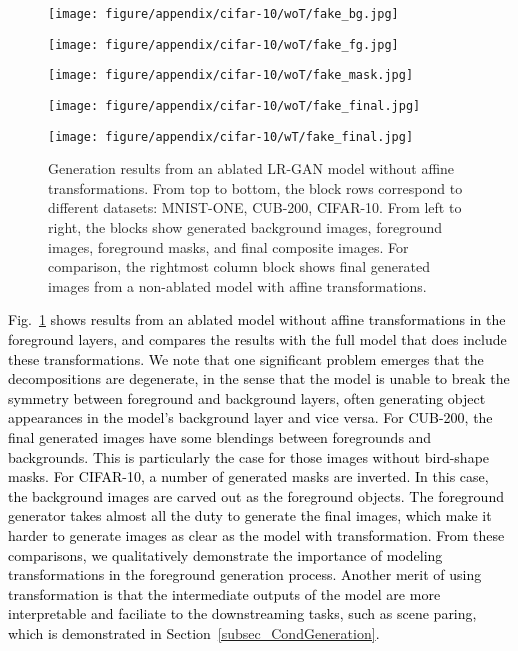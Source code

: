 \documentclass{article} \usepackage{iclr2017_conference,times}
\begin{document}
\begin{figure}[h]
\begin{minipage}{0.195\linewidth}
\center
\texttt{[image: figure/appendix/cifar-10/woT/fake\_bg.jpg]}
\end{minipage}
\begin{minipage}{0.195\linewidth}
\center
\texttt{[image: figure/appendix/cifar-10/woT/fake\_fg.jpg]}
\end{minipage}
\begin{minipage}{0.195\linewidth}
\center
\texttt{[image: figure/appendix/cifar-10/woT/fake\_mask.jpg]}
\end{minipage}
\begin{minipage}{0.195\linewidth}
\center
\texttt{[image: figure/appendix/cifar-10/woT/fake\_final.jpg]}
\end{minipage}
\begin{minipage}{0.195\linewidth}
\center
\texttt{[image: figure/appendix/cifar-10/wT/fake\_final.jpg]}
\end{minipage}
\caption{Generation results from an ablated LR-GAN model without affine transformations. From top to bottom, the block rows correspond to different datasets: MNIST-ONE, CUB-200, CIFAR-10. From left to right, the blocks show generated background images, foreground images, foreground masks, and final composite images. For comparison, the rightmost column block shows final generated images from a non-ablated model with affine transformations.}
\label{Fig_Appendix_noT}
\end{figure}

\textcolor{black}{Fig.~\ref{Fig_Appendix_noT} shows results from an ablated model without affine transformations in the foreground layers, and compares the results with the full model that does include these transformations. We note that one significant problem emerges that the decompositions are degenerate, in the sense that the model is unable to break the symmetry between foreground and background layers, often generating object appearances in the model's background layer and vice versa. For CUB-200, the final generated images have some blendings between foregrounds and backgrounds. This is particularly the case for those images without bird-shape masks. For CIFAR-10, a number of generated masks are inverted. In this case, the background images are carved out as the foreground objects. The foreground generator takes almost all the duty to generate the final images, which make it harder to generate images as clear as the model with transformation. From these comparisons, we qualitatively demonstrate the importance of modeling transformations in the foreground generation process. Another merit of using transformation is that the intermediate outputs of the model are more interpretable and faciliate to the downstreaming tasks, such as scene paring, which is demonstrated in Section~\ref{subsec_CondGeneration}.}
\end{document}
